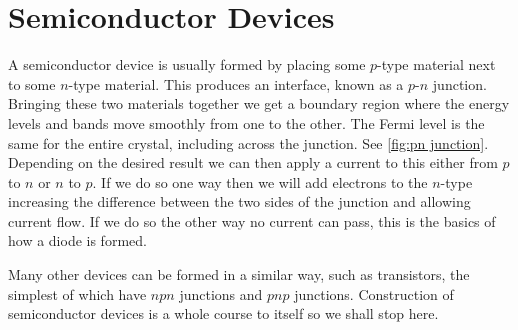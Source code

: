 \documentclass[fleqn]{NotesClass}
\begin{document}
    \section{Semiconductor Devices}
    A semiconductor device is usually formed by placing some \(p\)-type material next to some \(n\)-type material.
    This produces an interface, known as a \(p\)-\(n\) junction.
    Bringing these two materials together we get a boundary region where the energy levels and bands move smoothly from one to the other.
    The Fermi level is the same for the entire crystal, including across the junction.
    See \cref{fig:pn junction}.
    Depending on the desired result we can then apply a current to this either from \(p\) to \(n\) or \(n\) to \(p\).
    If we do so one way then we will add electrons to the \(n\)-type increasing the difference between the two sides of the junction and allowing current flow.
    If we do so the other way no current can pass, this is the basics of how a diode is formed.
    
    Many other devices can be formed in a similar way, such as transistors, the simplest of which have \(npn\) junctions and \(pnp\) junctions.
    Construction of semiconductor devices is a whole course to itself so we shall stop here.
    
\end{document}
